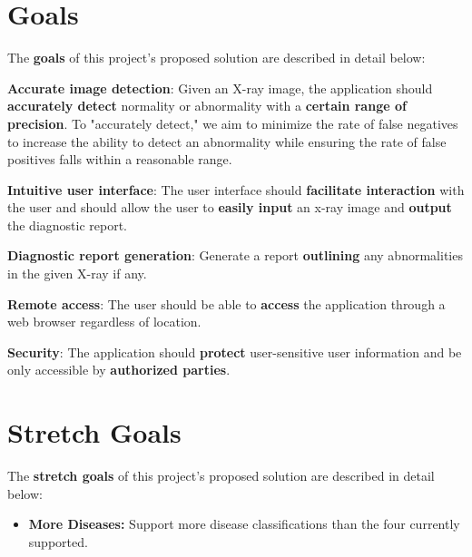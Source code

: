 \documentclass{article}
\begin{document}
\section{Goals}

The \textbf{goals} of this project's proposed solution are described in detail below:

\begin{itemize}
\begin{item}
\textbf{Accurate image detection}: Given an X-ray image, the application should \textbf{accurately detect} normality or abnormality with a \textbf{certain range of precision}. To "accurately detect," we aim to minimize the rate of false negatives to increase the ability to detect an abnormality while ensuring the rate of false positives falls within a reasonable range. 
\end{item}
\begin{item}
\textbf{Intuitive user interface}: The user interface should \textbf{facilitate interaction} with the user and should allow the user to \textbf{easily input} an x-ray image and \textbf{output} the diagnostic report.
\end{item}
\begin{item}
\textbf{Diagnostic report generation}: Generate a report \textbf{outlining} any abnormalities in the given X-ray if any. 
\end{item}
\begin{item}
\textbf{Remote access}: The user should be able to \textbf{access} the application through a web browser regardless of location.
\end{item}
\begin{item}
\textbf{Security}: The application should \textbf{protect} user-sensitive user information and be only accessible by \textbf{authorized parties}.
\end{item}
\end{itemize}

\section{Stretch Goals}

The \textbf{stretch goals} of this project's proposed solution are described in detail below:

\begin{itemize}
\begin{item}
\textbf{NLP Report}: Given an X-ray image, generate a \textbf{structured or free-form} radiology report of the diagnostic findings using \textbf{NLP}.
\end{item}
\item \textbf{More Diseases:} Support more disease classifications than the four currently supported.
\end{itemize}
\end{document}
